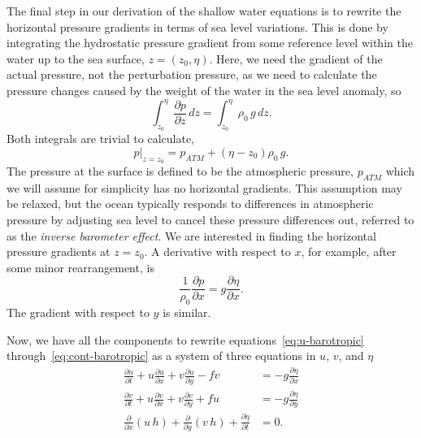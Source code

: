 \documentclass[11pt]{report}
\numberwithin{equation}{section}
\begin{document}
The final step in our derivation of the shallow water equations is to rewrite the horizontal pressure gradients in terms of sea level variations.  This is done by integrating the hydrostatic pressure gradient from some reference level within the water up to the sea surface, $z=(z_0, \eta)$.  Here, we need the gradient of the actual pressure, not the perturbation pressure, as we need to calculate the pressure changes caused by the weight of the water in the sea level anomaly, so
\begin{equation}
    \int_{z_0}^\eta \frac{\partial p}{\partial z} \,dz = \int_{z_0}^\eta \rho_0\,g\,dz.
\end{equation}
Both integrals are trivial to calculate,
\begin{equation}
    p|_{z=z_0} = p_{ATM} + (\eta-z_0)\rho_0\,g.
\end{equation}
The pressure at the surface is defined to be the atmospheric pressure, $p_{ATM}$ which we will assume for simplicity has no horizontal gradients. This assumption may be relaxed, but the ocean typically responds to differences in atmospheric pressure by adjusting sea level to cancel these pressure differences out, referred to as the {\it inverse barometer effect}.  We are interested in finding the horizontal pressure gradients at $z=z_0$.  A derivative with respect to $x$, for example, after some minor rearrangement, is
\begin{equation}
    \frac{1}{\rho_0}\frac{\partial p}{\partial x} = g\frac{\partial \eta}{\partial x}.
\end{equation}
The gradient with respect to $y$ is similar.

Now, we have all the components to rewrite equations~\ref{eq:u-barotropic} through~\ref{eq:cont-barotropic} as a system of three equations in $u$, $v$, and $\eta$
\begin{align}
    \frac{\partial u}{\partial t} 
        + u\frac{\partial u}{\partial x} 
        + v\frac{\partial u}{\partial y} - fv 
                &= -g\frac{\partial \eta}{\partial x} \label{eq:u-shallow} \\
    \frac{\partial v}{\partial t} 
        + u\frac{\partial v}{\partial x} 
        + v\frac{\partial v}{\partial y} + fu 
                &= -g\frac{\partial \eta}{\partial y}  \label{eq:v-shallow} \\
    \frac{\partial}{\partial x} (u\,h)
        + \frac{\partial }{\partial y} (v\,h)
        + \frac{\partial \eta}{\partial t} 
                &= 0. \label{eq:cont-shallow}
\end{align}
\end{document}
